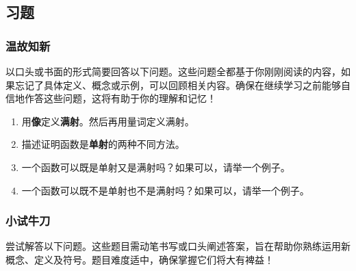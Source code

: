 
\subsection{习题}\label{sec:section7.4.5}

\subsubsection*{温故知新}

以口头或书面的形式简要回答以下问题。这些问题全都基于你刚刚阅读的内容，如果忘记了具体定义、概念或示例，可以回顾相关内容。确保在继续学习之前能够自信地作答这些问题，这将有助于你的理解和记忆！

\begin{enumerate}[label=(\arabic*)]
    \item 用\textbf{像}定义\textbf{满射}。然后再用量词定义满射。
    \item 描述证明函数是\textbf{单射}的两种不同方法。
    \item 一个函数可以既是单射又是满射吗？如果可以，请举一个例子。
    \item 一个函数可以既不是单射也不是满射吗？如果可以，请举一个例子。
\end{enumerate}

\subsubsection*{小试牛刀}

尝试解答以下问题。这些题目需动笔书写或口头阐述答案，旨在帮助你熟练运用新概念、定义及符号。题目难度适中，确保掌握它们将大有裨益！

